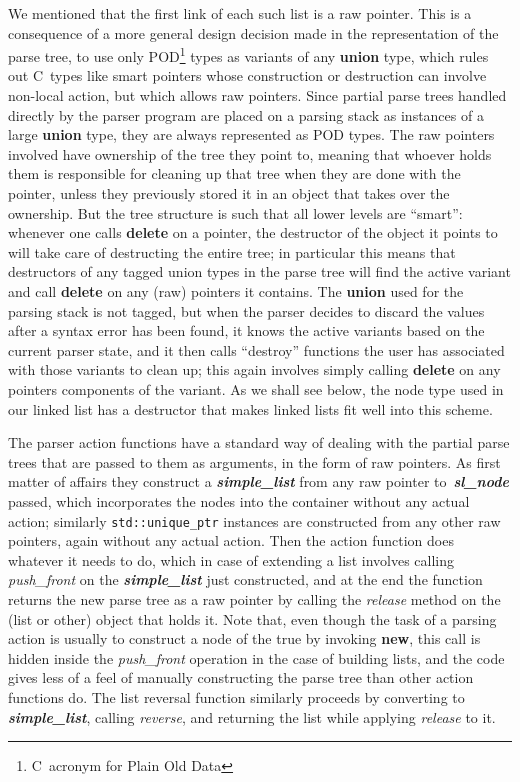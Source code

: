 \documentclass[12pt]{article}
\theoremstyle{plain}
\theoremstyle{definition}
\def\PP{\copy\PPbox}
\newcommand\Cee{\textsc{C}}
\newcommand\Cpp{\Cee\PP}
\newcommand\std[1]{\texttt{std::#1}}
\def\slnd.{\textbf{\textit{sl\_\!node}}}
\def\smpl.{\textbf{\textit{simple\_\!list}}}
\begin{document}
We mentioned that the first link of each such list is a raw pointer. This is a
consequence of a more general design decision made in the representation of the
parse tree, to use only POD\footnote{\Cpp\ acronym for Plain Old Data} types as
variants of any \textbf{union} type, which rules out \Cpp\ types like smart
pointers whose construction or destruction can involve non-local action, but
which allows raw pointers. Since partial parse trees handled directly by the
parser program are placed on a parsing stack as instances of a large
\textbf{union} type, they are always represented as POD types. The raw pointers
involved have ownership of the tree they point to, meaning that whoever holds
them is responsible for cleaning up that tree when they are done with the
pointer, unless they previously stored it in an object that takes over the
ownership. But the tree structure is such that all lower levels are ``smart'':
whenever one calls \textbf{delete} on a pointer, the destructor of the object it
points to will take care of destructing the entire tree; in particular this
means that destructors of any tagged union types in the parse tree will find the
active variant and call \textbf{delete} on any (raw) pointers it contains. The
\textbf{union} used for the parsing stack is not tagged, but when the parser
decides to discard the values after a syntax error has been found, it knows the
active variants based on the current parser state, and it then calls ``destroy''
functions the user has associated with those variants to clean up; this again
involves simply calling \textbf{delete} on any pointers components of the
variant. As we shall see below, the node type used in our linked list has a
destructor that makes linked lists fit well into this scheme.

The parser action functions have a standard way of dealing with the partial
parse trees that are passed to them as arguments, in the form of raw pointers.
As first matter of affairs they construct a \smpl. from any raw pointer
to~\slnd. passed, which incorporates the nodes into the container without any
actual action; similarly \std{unique\_\!ptr} instances are constructed from any
other raw pointers, again without any actual action. Then the action function
does whatever it needs to do, which in case of extending a list involves calling
\textit{push\_\!front} on the \smpl. just constructed, and at the end the
function returns the new parse tree as a raw pointer by calling the
\textit{release} method on the (list or other) object that holds it. Note that,
even though the task of a parsing action is usually to construct a node of the
true by invoking \textbf{new}, this call is hidden inside the
\textit{push\_\!front} operation in the case of building lists, and the code
gives less of a feel of manually constructing the parse tree than other action
functions do. The list reversal function similarly proceeds by converting to
\smpl., calling \textit{reverse}, and returning the list while applying
\textit{release} to it.
\end{document}
